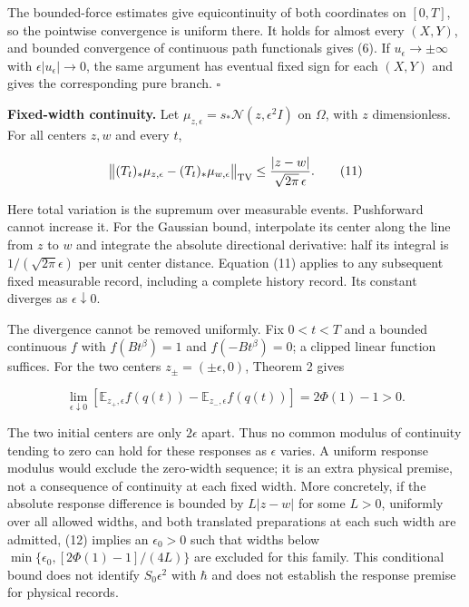 \documentclass[11pt,a4paper]{article}
\begin{document}
The bounded-force estimates give equicontinuity of both coordinates on
\([0,T]\), so the pointwise convergence is uniform there. It holds for
almost every \((X,Y)\), and bounded convergence of continuous path
functionals gives (6). If \(u_\epsilon\to\pm\infty\) with
\(\epsilon|u_\epsilon|\to0\), the same argument has eventual fixed sign
for each \((X,Y)\) and gives the corresponding pure branch. \(\square\)

\textbf{Fixed-width continuity.} Let
\(\mu_{z,\epsilon}=s_*\mathcal N(z,\epsilon^2I)\) on \(\Omega\), with
\(z\) dimensionless. For all centers \(z,w\) and every \(t\),

\[
 \bigl\|(T_t)_*\mu_{z,\epsilon}-(T_t)_*\mu_{w,\epsilon}\bigr\|_{\rm TV}
 \le \frac{|z-w|}{\sqrt{2\pi}\,\epsilon}. \tag{11}
\]

Here total variation is the supremum over measurable events. Pushforward
cannot increase it. For the Gaussian bound, interpolate its center along
the line from \(z\) to \(w\) and integrate the absolute directional
derivative: half its integral is \(1/(\sqrt{2\pi}\epsilon)\) per unit
center distance. Equation (11) applies to any subsequent fixed
measurable record, including a complete history record. Its constant
diverges as \(\epsilon\downarrow0\).

The divergence cannot be removed uniformly. Fix \(0<t<T\) and a bounded
continuous \(f\) with \(f(Bt^\beta)=1\) and \(f(-Bt^\beta)=0\); a
clipped linear function suffices. For the two centers
\(z_\pm=(\pm\epsilon,0)\), Theorem 2 gives

\[
 \lim_{\epsilon\downarrow0}
 \left[\mathbb E_{z_+,\epsilon}f(q(t))-
       \mathbb E_{z_-,\epsilon}f(q(t))\right]
 =2\Phi(1)-1>0. \tag{12}
\]

The two initial centers are only \(2\epsilon\) apart. Thus no common
modulus of continuity tending to zero can hold for these responses as
\(\epsilon\) varies. A uniform response modulus would exclude the
zero-width sequence; it is an extra physical premise, not a consequence
of continuity at each fixed width. More concretely, if the absolute
response difference is bounded by \(L|z-w|\) for some \(L>0\), uniformly
over all allowed widths, and both translated preparations at each such
width are admitted, (12) implies an \(\epsilon_0>0\) such that widths
below \(\min\{\epsilon_0,[2\Phi(1)-1]/(4L)\}\) are excluded for this
family. This conditional bound does not identify \(S_0\epsilon^2\) with
\(\hbar\) and does not establish the response premise for physical
records.
\end{document}
